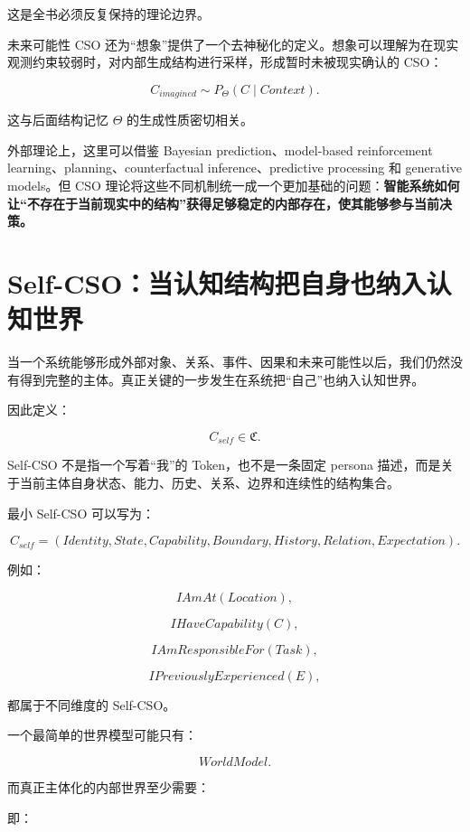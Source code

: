 这是全书必须反复保持的理论边界。

未来可能性 CSO 还为“想象”提供了一个去神秘化的定义。想象可以理解为在现实观测约束较弱时，对内部生成结构进行采样，形成暂时未被现实确认的 CSO：

\[
C_{imagined}
\sim
P_{\Theta}
(C\mid Context).
\]

这与后面结构记忆 \(\Theta\) 的生成性质密切相关。

外部理论上，这里可以借鉴 Bayesian prediction、model-based reinforcement learning、planning、counterfactual inference、predictive processing 和 generative models。但 CSO 理论将这些不同机制统一成一个更加基础的问题：\textbf{智能系统如何让“不存在于当前现实中的结构”获得足够稳定的内部存在，使其能够参与当前决策。}


\section{Self-CSO：当认知结构把自身也纳入认知世界}

当一个系统能够形成外部对象、关系、事件、因果和未来可能性以后，我们仍然没有得到完整的主体。真正关键的一步发生在系统把“自己”也纳入认知世界。

因此定义：

\[
\boxed{
C_{self}
\in
\mathfrak C.
}
\]

Self-CSO 不是指一个写着“我”的 Token，也不是一条固定 persona 描述，而是关于当前主体自身状态、能力、历史、关系、边界和连续性的结构集合。

最小 Self-CSO 可以写为：

\[
C_{self}
=
(
Identity,
State,
Capability,
Boundary,
History,
Relation,
Expectation
).
\]

例如：

\[
IAmAt(Location),
\]

\[
IHaveCapability(C),
\]

\[
IAmResponsibleFor(Task),
\]

\[
IPreviouslyExperienced(E),
\]

都属于不同维度的 Self-CSO。

一个最简单的世界模型可能只有：

\[
WorldModel.
\]

而真正主体化的内部世界至少需要：

\begin{statementbox}
\centering
{}
\end{statementbox}

即：

